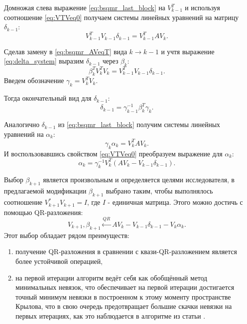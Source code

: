 Домножая слева выражение \eqref{eq:bsqmr_last_block} на $V_{k-1}^T$ и используя соотношение
\eqref{eq:VTVeq0} получаем системы линейных уравнений на матрицу $\delta_{k-1}$:
\begin{equation}
    \label{eq:delta_system}
    V_{k-1}^T V_{k-1} \delta_{k-1} = V_{k-1}^T A V_k.
\end{equation}

Сделав замену в \eqref{eq:bsqmr_AVeqT} вида $k \rightarrow k-1$ и учтя выражение 
\eqref{eq:delta_system} выразим $\delta_{k-1}$ через $\beta_k$:
\begin{equation*}
    \beta_{k}^T V_k^T V_k = V_{k-1}^T V_{k-1} \delta_{k-1}.
\end{equation*}
Введем обозначение $\gamma_k = V_k^T V_k$.

Тогда окончательный вид для $\delta_{k-1}$:
\begin{equation}
    \label{eq:delta_final}
    \delta_{k-1} = \gamma_{k-1}^{-1} \beta_k^T \gamma_k.
\end{equation}

Аналогично $\delta_{k-1}$ из \eqref{eq:bsqmr_last_block} получим системы линейных
уравнений на $\alpha_k$:
\begin{equation*}
    \gamma_k \alpha_k = V_k^T A V_k.
\end{equation*}
И воспользовавшись свойством \eqref{eq:VTVeq0} преобразуем выражение для $\alpha_k$:
\begin{equation}
    \alpha_k = \gamma_k^{-1} V_k^T (A V_k - V_{k-1} \delta_{k-1}).
\end{equation}

Выбор $\beta_{k+1}$ является произвольным и определяется целями исследователя, в 
предлагаемой модификации $\beta_{k+1}$ выбрано таким, чтобы выполнялось соотношение
$V_{k+1}^* V_{k+1} = I$, где $I$ - единичная матрица. Этого можно достичь с помощью QR-разложения:
\begin{equation}
    V_{k+1}, \beta_{k+1} \xleftarrow{QR} A V_k - V_{k-1} \delta_{k-1} - V_k \alpha_k. 
\end{equation} 
Этот выбор обладает рядом преимуществ: \begin{enumerate}
    \item получение QR-разложения в сравнении с квази-QR-разложением является более устойчивой операцией, 
    \item на первой итерации алгоритм ведёт себя как обобщённый метод минимальных невязок, что обеспечивает на первой итерации достигается точный минимум невязки в построенном к этому моменту пространстве Крылова, что в свою очередь предотвращает большие скачки невязки на первых итерациях, как это наблюдается в алгоритме из статьи \cite{doi:10.1137/0917019}.
\end{enumerate}  

